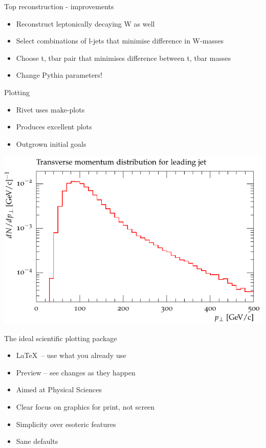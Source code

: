 \documentclass{beamer}
\begin{document}
  \begin{frame}{Top reconstruction - improvements}
    \begin{itemize}[<uncover@+>]
      \item Reconstruct leptonically decaying W as well
      \item Select combinations of l-jets that minimise difference in W-masses
      \item Choose t, tbar pair that minimises difference between t, tbar masses
      \item Change Pythia parameters!
    \end{itemize}
  \end{frame}
	
  \begin{frame}{Plotting}
    \begin{itemize}[<uncover@+>]
      \item Rivet uses make-plots
      \item Produces excellent plots
      \item Outgrown initial goals
    \end{itemize}
  \end{frame}
  \begin{frame}
    \includegraphics[width=\textwidth]{makeplots}
  \end{frame}

  \begin{frame}{The ideal scientific plotting package}
    \begin{itemize}[<uncover@+>]
      \item \LaTeX\ -- use what you already use
      \item Preview -- see changes as they happen
      \item Aimed at Physical Sciences
      \item Clear focus on graphics for print, not screen
      \item Simplicity over esoteric features
      \item Sane defaults
    \end{itemize}
  \end{frame}
\end{document}
